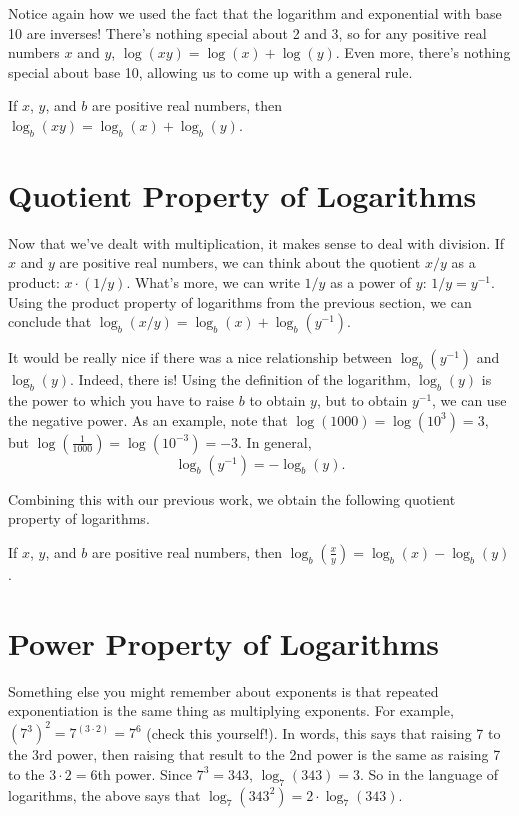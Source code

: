 \documentclass[nooutcomes]{ximera}
\begin{document}
Notice again how we used the fact that the logarithm and exponential with base 10 are inverses! There's nothing special about 2 and 3, so for any positive real numbers $x$ and $y$, $\log(xy) = \log(x) + \log(y)$. Even more, there's nothing special about base 10, allowing us to come up with a general rule.
\begin{callout}
If $x$, $y$, and $b$ are positive real numbers, then $\log_b(xy) = \log_b(x) + \log_b(y)$.
\end{callout} 

\section{Quotient Property of Logarithms}
Now that we've dealt with multiplication, it makes sense to deal with division. If $x$ and $y$ are positive real numbers, we can think about the quotient $x/y$ as a product: $x \cdot (1/y)$. What's more, we can write $1/y$ as a power of $y$: $1/y = y^{-1}$. Using the product property of logarithms from the previous section, we can conclude that $\log_b(x/y) = \log_b(x) + \log_b(y^{-1})$. 

It would be really nice if there was a nice relationship between $\log_b(y^{-1})$ and $\log_b(y)$. Indeed, there is! Using the definition of the logarithm, $\log_b(y)$ is the power to which you have to raise $b$ to obtain $y$, but to obtain $y^{-1}$, we can use the negative power. As an example, note that $\log(1000) = \log(10^3) = 3$, but $\log\left(\frac{1}{1000}\right) = \log(10^{-3}) = -3$. In general, 
$$
\log_b(y^{-1}) = -\log_b(y).
$$

Combining this with our previous work, we obtain the following quotient property of logarithms.
\begin{callout}
If $x$, $y$, and $b$ are positive real numbers, then $\log_b\left(\frac{x}{y}\right) = \log_b(x) - \log_b(y)$.
\end{callout} 

\section{Power Property of Logarithms}
Something else you might remember about exponents is that repeated exponentiation is the same thing as multiplying exponents. For example, $(7^3)^2 = 7^{(3\cdot 2)} = 7^6$ (check this yourself!). In words, this says that raising 7 to the 3rd power, then raising that result to the 2nd power is the same as raising 7 to the $3 \cdot 2 = 6$th power. Since $7^3 = 343$, $\log_7(343) = 3$. So in the language of logarithms, the above says that $\log_7(343^2) = 2\cdot \log_7(343)$. 
\end{document}
